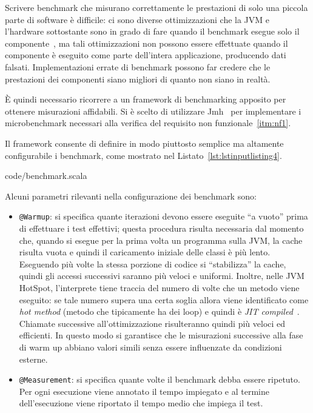 Scrivere benchmark che misurano correttamente le prestazioni di solo una piccola parte di software è difficile: ci sono
diverse ottimizzazioni che la JVM e l'hardware sottostante sono in grado di fare quando il benchmark
esegue solo il componente~\cite{jmh:details}, ma tali ottimizzazioni non possono essere effettuate quando il componente
è eseguito come parte dell'intera applicazione, producendo dati falsati.
Implementazioni errate di benchmark possono far credere che le prestazioni dei componenti siano migliori di quanto non
siano in realtà.

È quindi necessario ricorrere a un framework di benchmarking apposito per ottenere misurazioni affidabili.
Si è scelto di utilizzare Jmh~\cite{jmh} per implementare i microbenchmark necessari alla verifica del
requisito non funzionale~\ref{itm:nf1}.

Il framework consente di definire in modo piuttosto semplice ma altamente configurabile i benchmark, come mostrato nel
Listato~\ref{lst:lstinputlisting4}.


{code/benchmark.scala}

Alcuni parametri rilevanti nella configurazione dei benchmark sono:
\begin{itemize}
    \item \texttt{@Warmup}: si specifica quante iterazioni devono essere eseguite ``a vuoto'' prima di effettuare i
    test effettivi;
    questa procedura risulta necessaria dal momento che, quando si esegue per la prima volta un programma sulla JVM, la
    cache risulta vuota e quindi il caricamento iniziale delle classi è più lento.
    Eseguendo più volte la stessa porzione di codice si ``stabilizza'' la cache, quindi gli accessi successivi saranno
    più veloci e uniformi.
    Inoltre, nelle JVM HotSpot, l'interprete tiene traccia del numero di volte che un metodo viene eseguito: se tale
    numero supera una certa soglia allora viene identificato come \textit{hot method} (metodo che tipicamente ha dei
    loop) e quindi è \textit{JIT compiled}~\cite{jmh:details}.
    Chiamate successive all'ottimizzazione risulteranno quindi più veloci ed efficienti.
    In questo modo si garantisce che le misurazioni successive alla fase di warm up abbiano valori simili senza essere
    influenzate da condizioni esterne.
    \item \texttt{@Measurement}: si specifica quante volte il benchmark debba essere ripetuto.
    Per ogni esecuzione viene annotato il tempo impiegato e al termine dell'esecuzione viene riportato il tempo medio
    che impiega il test.
\end{itemize}

